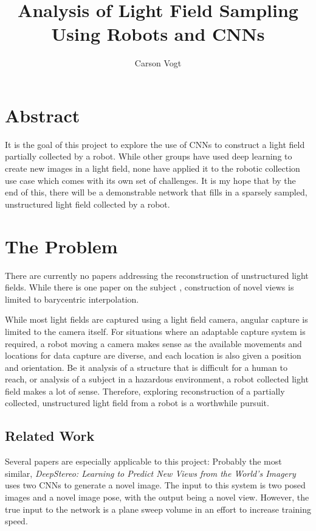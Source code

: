 \documentclass[12pt]{report}
\begin{document}
\title{Analysis of Light Field Sampling Using Robots and CNNs \vspace{2.5cm}}	
\author{
\Large Carson Vogt \vspace{1cm} \\ 
}


\maketitle

\section*{Abstract}
It is the goal of this project to explore the use of CNNs to construct a light field partially collected by a robot. While other groups have used deep learning to create new images in a light field, none have applied it to the robotic collection use case which comes with its own set of challenges. It is my hope that by the end of this, there will be a demonstrable network that fills in a sparsely sampled, unstructured light field collected by a robot. 

\section*{The Problem}
There are currently no papers addressing the reconstruction of unstructured light fields. While there is one paper on the subject \cite{Davis12}, construction of novel views is limited to barycentric interpolation. 

While most light fields are captured using a light field camera, angular capture is limited to the camera itself. For situations where an adaptable capture system is required, a robot moving a camera makes sense as the available movements and locations for data capture are diverse, and each location is also given a position and orientation. Be it analysis of a structure that is difficult for a human to reach, or analysis of a subject in a hazardous environment, a robot collected light field makes a lot of sense. Therefore, exploring reconstruction of a partially collected, unstructured light field from a robot is a worthwhile pursuit. 

\subsection*{Related Work}
Several papers are especially applicable to this project:
Probably the most similar, \emph{DeepStereo: Learning to Predict New Views from the World's Imagery} uses two CNNs to generate a novel image. The input to this system is two posed images and a novel image pose, with the output being a novel view. However, the true input to the network is a plane sweep volume in an effort to increase training speed.
\end{document}
